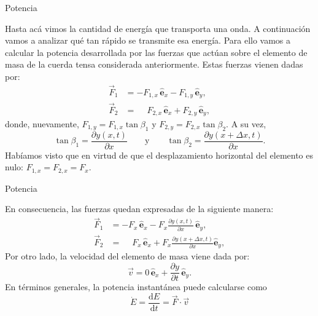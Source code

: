\documentclass[11pt,handout,aspectratio=1610]{beamer}
\newcommand{\fdiff}[2]{\dfrac{\text{d} #1}{\text{d} #2}}
\newcommand{\pdiff}[2]{\frac{\partial #1}{\partial #2}}
\newcommand{\ver}[1]{\hat{\mathbf{#1}}}
\begin{document}
\begin{frame}{Potencia}

    Hasta acá vimos la cantidad de energía que transporta una onda. A continuación vamos a analizar qué tan rápido se transmite esa energía. Para ello vamos a calcular la potencia desarrollada por las fuerzas que actúan sobre el elemento de masa de la cuerda tensa considerada anteriormente. Estas fuerzas vienen dadas por:
    \begin{align*}
        \vec{F}_1 &= - F_{1,x} \, \ver{e}_x - F_{1,y} \, \ver{e}_y, \\
        \vec{F}_2 &= \phantom{-}F_{2,x} \, \ver{e}_x + F_{2,y}\, \ver{e}_y,
    \end{align*} donde, nuevamente, $F_{1,y} = F_{1,x} \tan \beta_1$ y $F_{2,y} = F_{2,x} \tan \beta_2$. A su vez, $$ \tan \beta_1 = \pdiff{y \left(x,t\right)}{x}  \qquad \text{y} \qquad \tan \beta_2 = \pdiff{y \left(x+\Delta x,t\right)}{x}.$$ Habíamos visto que en virtud de que el desplazamiento horizontal del elemento es nulo: $F_{1,x} = F_{2,x} = F_x $.
    
\end{frame}

\begin{frame}{Potencia}

    En consecuencia, las fuerzas quedan expresadas de la siguiente manera:
    \begin{align*}
        \vec{F}_1 &= - F_{x} \, \ver{e}_x - F_{x} \pdiff{y \left(x,t\right)}{x} \, \ver{e}_y, \\
        \vec{F}_2 &= \phantom{-}F_{x} \, \ver{e}_x + F_{x} \pdiff{y \left(x+\Delta x,t\right)}{x} \ver{e}_y,
    \end{align*} Por otro lado, la velocidad del elemento de masa viene dada por: $$ \vec{v} = 0 \, \ver{e}_x + \pdiff{y}{t} \, \ver{e}_y. $$ En términos generales, la potencia instantánea puede calcularse como $$\dot{E} = \fdiff{E}{t} = \vec{F} \cdot \vec{v} $$
    
\end{frame}
\end{document}
